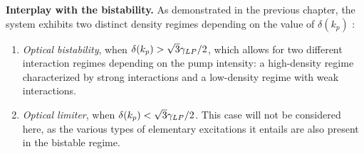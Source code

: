 \bigskip

\textbf{Interplay with the bistability.} As demonstrated in the previous chapter, the system exhibits two distinct density regimes depending on the value of $\delta(k_p)$ :  

\begin{enumerate}
    \item \textit{Optical bistability}, when $\delta(k_p)>\sqrt{3} \gamma_{LP} / 2$, which allows for two different interaction regimes depending on the pump intensity: a high-density regime characterized by strong interactions and a low-density regime with weak interactions.
    \item \textit{Optical limiter}, when $\delta(k_p)<\sqrt{3} \gamma_{LP} / 2$. This case will not be considered here, as the various types of elementary excitations it entails are also present in the bistable regime.
\end{enumerate} 

